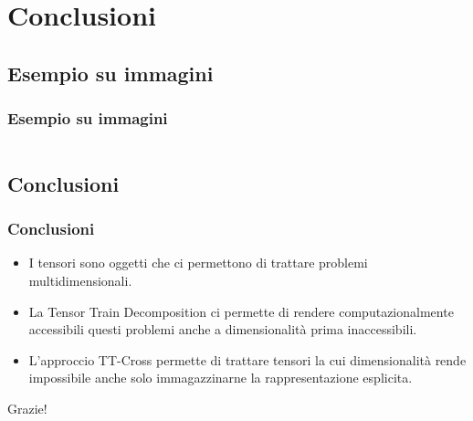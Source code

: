 \documentclass[compress]{beamer}
\theoremstyle{definition}
\theoremstyle{plain}
\begin{document}
\section{Conclusioni}
\subsection{Esempio su immagini}
\begin{frame}
\frametitle{Esempio su immagini}
\begin{columns}
\begin{column}{0.5\textwidth}
	\vspace{3mm}
\end{column}
\begin{column}{0.5\textwidth}
	\vspace{3mm}
\end{column}
\end{columns}
\end{frame}

\subsection{Conclusioni}
\begin{frame}
\frametitle{Conclusioni}
\begin{itemize}
	\item I tensori sono oggetti che ci permettono di trattare problemi multidimensionali.
	\item La Tensor Train Decomposition ci permette di rendere computazionalmente accessibili questi problemi anche a dimensionalità prima inaccessibili.
	\item L'approccio TT-Cross permette di trattare tensori la cui dimensionalità rende impossibile anche solo immagazzinarne la rappresentazione esplicita.
\end{itemize}

\pause
\vspace{2mm}
\begin{center}
	\Huge Grazie!
\end{center}
\end{frame}

\end{document}
